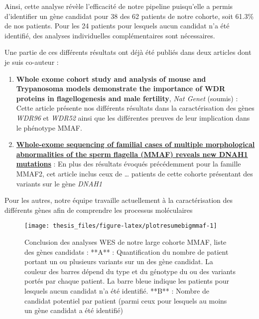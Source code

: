 \documentclass[12pt,twoside]{reedthesis}
\theoremstyle{definition}
\theoremstyle{definition}
\theoremstyle{remark}
\begin{document}
  Ainsi, cette analyse révèle l'efficacité de notre pipeline puisqu'elle a
  permis d'identifier un gène candidat pour 38 des 62 patients de notre
  cohorte, soit 61.3\% de nos patients. Pour les 24 patients pour lesquels
  aucun candidat n'a été identifié, des analyses individuelles
  complémentaires sont nécessaires.
  
  Une partie de ces différents résultats ont déjà été publiés dans deux
  articles dont je suis co-auteur :
  
  \begin{enumerate}
  \def\labelenumi{\arabic{enumi}.}
  \item
    \textbf{Whole exome cohort study and analysis of mouse and Trypanosoma
    models demonstrate the importance of WDR proteins in flagellogenesis
    and male fertility}, \emph{Nat Genet} (soumis) : Cette article
    présente nos différents résultats dans la caractérisation des gènes
    \emph{WDR96} et \emph{WDR52} ainsi que les différentes preuves de leur
    implication dans le phénotype MMAF.
  \item
    \protect\hyperlink{famdnah1}{\textbf{Whole-exome sequencing of
    familial cases of multiple morphological abnormalities of the sperm
    flagella (MMAF) reveals new DNAH1 mutations}} : En plus des résultats
    évoqués précédemment pour la famille MMAF2, cet article inclus ceux de
    \ldots{} patients de cette cohorte présentant des variants sur le gène
    \emph{DNAH1}
  \end{enumerate}
  
  Pour les autres, notre équipe travaille actuellement à la
  caractérisation des différents gènes afin de comprendre les processus
  moléculaires
  
  \newpage
  
  \begin{figure}
  
  {\centering \texttt{[image: thesis\_files/figure-latex/plotresumebigmmaf-1]} 
  
  }
  
  \caption[Conclusion des analyses WES de notre large cohorte MMAF, liste des gènes candidats]{Conclusion des analyses WES de notre large cohorte MMAF, liste des gènes candidats : **A** : Quantification du nombre de patient portant un ou plusieurs variants sur un des gène candidat. La couleur des barres dépend du type et du génotype du ou des variants portés par chaque patient. La barre bleue indique les patients pour lesquels aucun candidat n'a été identifié. **B** : Nombre de candidat potentiel par patient (parmi ceux pour lesquels au moins un gène candidat a été identifié)}\label{fig:plotresumebigmmaf}
  \end{figure}
  
\end{document}
